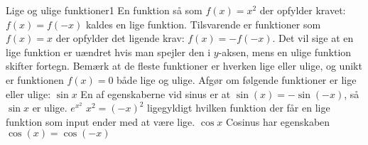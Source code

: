 \begin{opgave}{Lige og ulige funktioner}{1}
En funktion så som $f(x) = x^2$ der opfylder kravet: $f(x) = f(-x)$ kaldes en lige funktion. Tilsvarende er funktioner som $f(x) = x$ der opfylder det ligende krav: $f(x)=-f(-x)$.
Det vil sige at en lige funktion er uændret hvis man spejler den i $y$-aksen, mens en ulige funktion skifter fortegn.
Bemærk at de fleste funktioner er hverken lige eller ulige, og unikt er funktionen $f(x) = 0$ både lige og ulige.
Afgør om følgende funktioner er lige eller ulige:
\opg $\sin x$ En af egenskaberne vid sinus er at $\sin(x) = -\sin(-x)$, så $\sin x$ er ulige.
\opg $e^{x^2}$ $x^2 = (-x)^2$ ligegyldigt hvilken funktion der får en lige funktion som input ender med at være lige.
\opg $\cos x$ Cosinus har egenskaben $\cos(x) = \cos(-x)$
\end{opgave}

